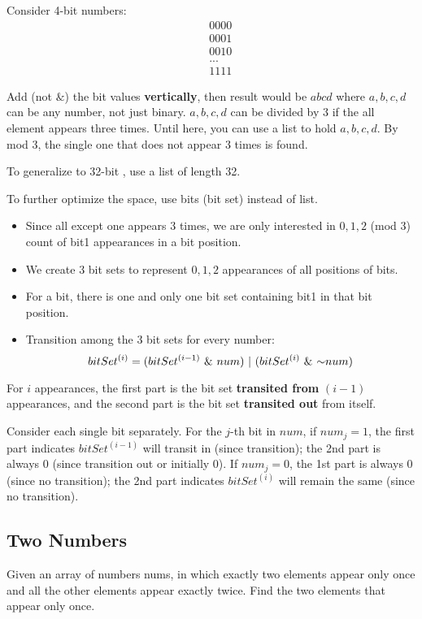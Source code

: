 Consider 4-bit numbers:
\begin{eqnarray*}
&& 0000 \\
&& 0001 \\
&& 0010 \\
&& ... \\
&& 1111
\end{eqnarray*}

Add (not $\&$) the bit values \textbf{vertically}, then result would be $abcd$ where $a, b, c, d$ can be any number, not just binary. $a, b, c, d$ can be divided by 3 if the all element appears three times. Until here, you can use a list to hold $a, b, c, d$. By mod 3, the single one that does not appear 3 times is found. 

To generalize to 32-bit , use a list of length 32.

To further optimize the space, use bits (bit set) instead of list. 
\begin{itemize}
\item Since all except one appears 3 times, we are only interested in $0, 1, 2$ (mod 3) count of bit1 appearances in a bit position.
\item We create 3 bit sets to represent $0, 1, 2$ appearances of all positions of bits.
\item For a bit, there is one and only one bit set containing bit1 in that bit position.
\item Transition among the 3 bit sets for every number:
$$
bitSet^{(i)} = (bitSet^{(i-1)}\ \&\  num)\ |\ (bitSet^{(i)}\ \&\  \mathord{\sim} num)
$$
\end{itemize}

For $i$ appearances, the first part is the bit set \textbf{transited from} $(i-1)$ appearances, and the second part is the bit set \textbf{transited out} from itself.

Consider each single bit separately. For the $j$-th bit in $num$, if $num_j=1$, the first part indicates $bitSet^{(i-1)}$ will transit in (since transition); the 2nd part is always 0 (since transition out or initially 0). If $num_j=0$, the 1st part is always 0 (since no transition); the 2nd part indicates $bitSet^{(i)}$ will remain the same (since no transition). 



\subsection{Two Numbers} 
Given an array of numbers nums, in which exactly two elements appear only once and all the other elements appear exactly twice. Find the two elements that appear only once.

